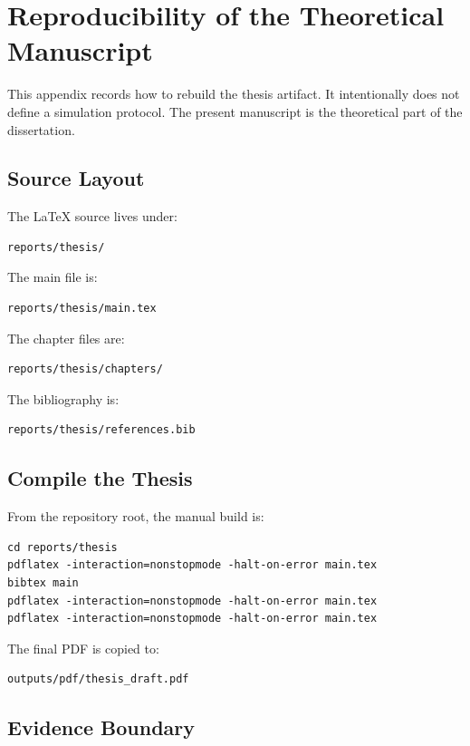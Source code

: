 \chapter{Reproducibility of the Theoretical Manuscript}

This appendix records how to rebuild the thesis artifact. It intentionally does
not define a simulation protocol. The present manuscript is the theoretical
part of the dissertation.

\section{Source Layout}

The LaTeX source lives under:

\begin{verbatim}
reports/thesis/
\end{verbatim}

The main file is:

\begin{verbatim}
reports/thesis/main.tex
\end{verbatim}

The chapter files are:

\begin{verbatim}
reports/thesis/chapters/
\end{verbatim}

The bibliography is:

\begin{verbatim}
reports/thesis/references.bib
\end{verbatim}

\section{Compile the Thesis}

From the repository root, the manual build is:

\begin{verbatim}
cd reports/thesis
pdflatex -interaction=nonstopmode -halt-on-error main.tex
bibtex main
pdflatex -interaction=nonstopmode -halt-on-error main.tex
pdflatex -interaction=nonstopmode -halt-on-error main.tex
\end{verbatim}

The final PDF is copied to:

\begin{verbatim}
outputs/pdf/thesis_draft.pdf
\end{verbatim}

\section{Evidence Boundary}

